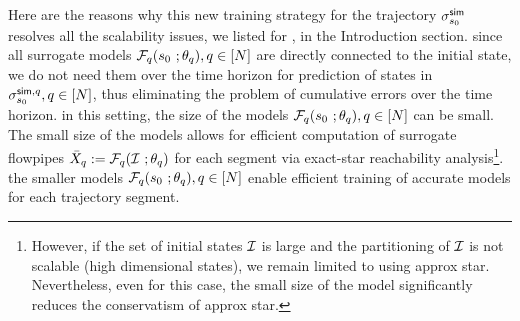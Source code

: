Here are the reasons why this new training strategy for the trajectory $\sigma^{\mathsf{sim}}_{s_0}$ resolves all the scalability issues, we listed for \cite{hashemi2024statistical}, in the Introduction section.  since all surrogate models $\mathcal{F}_q(s_0\ ; \theta_q), q \in [N]$ are directly connected to the initial state, we do not need  them  over the time horizon for prediction of states in  $\sigma^{\mathsf{sim} , q}_{s_0}, q\in[N]$, thus eliminating the problem of cumulative errors over the time horizon.  in this setting, the size of the models $\mathcal{F}_q(s_0\ ; \theta_q), q \in [N]$ can be small. The small size of the models allows for efficient computation of surrogate flowpipes $\bar{X}_q := \mathcal{F}_q(\mathcal{I}\ ; \theta_q)$ for each segment via exact-star reachability analysis\footnote{However, if the set of initial states $\mathcal{I}$ is large and the partitioning of $\mathcal{I}$ is not scalable (high dimensional states), we remain limited to using approx star. Nevertheless, even for this case, the small size of the model significantly reduces the conservatism of approx star.}. 
 the smaller models $\mathcal{F}_q(s_0\ ; \theta_q), q \in [N]$ enable efficient training of accurate models for each trajectory segment. 


